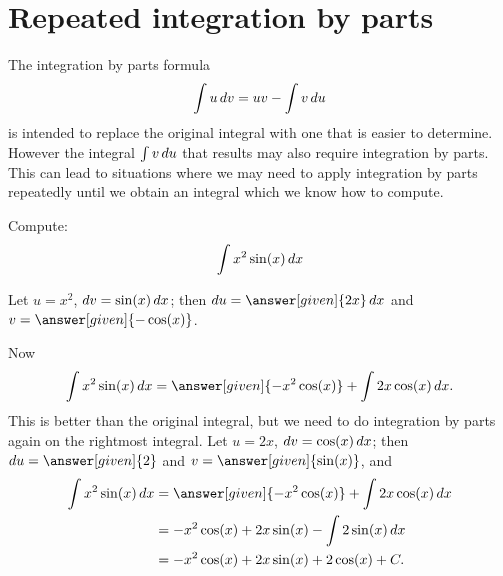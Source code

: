 \documentclass[noauthor]{ximera}
\begin{document}
\section{Repeated integration by parts}

The  integration by parts formula
 \[
\int u \mathop{}\!d v= uv - \int v \mathop{}\!d u
\]
 is intended to replace the original integral with one that is easier to determine. However the integral $\int v \mathop{}\!d u$ that results may also require integration by parts. This can lead to situations where we may need to apply integration by parts repeatedly until we obtain an integral which we know how to compute. 


%

\begin{example}
Compute:
\[
\int x^2\sin(x)\mathop{}\!d x
\] 
\begin{explanation}
Let $u=x^2$, $\mathop{}\!d v=\sin(x)\mathop{}\!d x$; then $\d u=\answer[given]{2x}\d x$ and $v=\answer[given]{-\cos(x)}$. 

Now 
\[
\int x^2\sin(x)\d x=\answer[given]{-x^2\cos(x)}+\int 2x\cos(x)\d x.
\] 
This is better than the original integral, but we need to do
integration by parts again on the rightmost integral. Let $u=2x$, $\mathop{}\!d v=\cos(x)\mathop{}\!d x$; then $\d u=\answer[given]{2}$
and $v=\answer[given]{\sin(x)}$, and
\begin{align*}
  \int x^2\sin(x)\d x &=\answer[given]{-x^2\cos(x)}+\int 2x\cos(x)\d x \\
  &=-x^2\cos(x)+ 2x\sin(x) - \int 2\sin(x)\d x \\
  &=-x^2\cos(x)+ 2x\sin(x) + 2\cos(x) + C. 
\end{align*}
\end{explanation}
\end{example}
\end{document}
